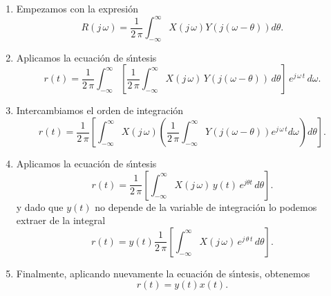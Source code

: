 \begin{enumerate}
\item Empezamos con la expresi\'{o}n 
\begin{equation}
        R\left( j \, \omega \right) =
        \frac{1}{2 \, \pi }
        \int_{-\infty }^{\infty }
             X\left(j \, \omega \right) Y\left( j\left( \omega -\theta \right) \right) d\theta .
\end{equation}

\item Aplicamos la ecuaci\'{o}n de s\'{\i}ntesis 
\begin{equation}
        r\left( t\right) =
                \frac{1}{2 \, \pi }
                \int_{-\infty }^{\infty }
                \left[ \frac{1}{2 \, \pi }
                          \int_{-\infty }^{\infty }
                              X\left( j \, \omega \right) \, Y\left( j\left(\omega -\theta \right) \right) \, 
                          d\theta 
                \right] \, e^{j \, \omega \, t} \,
                d\omega .
\end{equation}

\item Intercambiamos el orden de integraci\'{o}n 
\begin{equation}
        r\left( t\right) =
        \frac{1}{2 \, \pi }
        \left[ \int_{-\infty }^{\infty }
                X\left(j \, \omega \right) \left( \frac{1}{2 \, \pi }
                \int_{-\infty }^{\infty }
                    Y\left(j\left( \omega -\theta \right) \right) e^{j \, \omega \, t}d\omega \right) d\theta 
        \right].
\end{equation}

\item Aplicamos la ecuaci\'{o}n de s\'{\i}ntesis 
\begin{equation}
        r\left( t\right) =
                \frac{1}{2 \, \pi }
                \left[ 
                     \int_{-\infty }^{\infty }X\left(j \, \omega \right) \, y\left( t\right) \, e^{j\theta t} \, d\theta 
                \right].
\end{equation}
y dado que $y\left( t \right) $ no depende de la variable de integraci\'{o}n lo podemos extraer de la 
integral 
\begin{equation}
   r\left( t\right) =
       y\left( t\right) 
      \frac{1}{2 \, \pi } \left[ \int_{-\infty}^{\infty }X\left( j \, \omega \right) \,  e^{j \, \theta \, t} \, d\theta \right] .
\end{equation}

\item Finalmente, aplicando nuevamente la ecuaci\'{o}n de s\'{\i}ntesis, obtenemos
\begin{equation}
        r\left( t\right) = y\left( t\right) x\left( t\right) .
\end{equation}

\end{enumerate}

